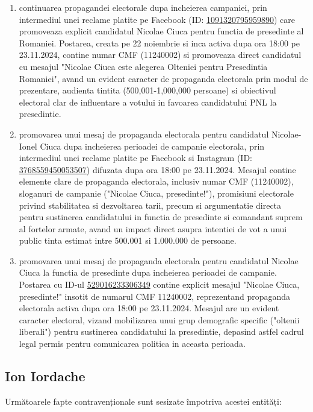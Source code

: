 \documentclass[a4paper,12pt]{article}
\begin{document}
\begin{enumerate}[leftmargin=*, label=\arabic*.)]
    \item continuarea propagandei electorale dupa incheierea campaniei, prin intermediul unei reclame platite pe Facebook (ID: \href{https://www.facebook.com/ads/library/?id=1091320795959890}{1091320795959890}) care promoveaza explicit candidatul Nicolae Ciuca pentru functia de presedinte al Romaniei. Postarea, creata pe 22 noiembrie si inca activa dupa ora 18:00 pe 23.11.2024, contine numar CMF (11240002) si promoveaza direct candidatul cu mesajul "Nicolae Ciuca este alegerea Olteniei pentru Presedintia Romaniei", avand un evident caracter de propaganda electorala prin modul de prezentare, audienta tintita (500,001-1,000,000 persoane) si obiectivul electoral clar de influentare a votului in favoarea candidatului PNL la presedintie.
    \item promovarea unui mesaj de propaganda electorala pentru candidatul Nicolae-Ionel Ciuca dupa incheierea perioadei de campanie electorala, prin intermediul unei reclame platite pe Facebook si Instagram (ID: \href{https://www.facebook.com/ads/library/?id=3768559450053507}{3768559450053507}) difuzata dupa ora 18:00 pe 23.11.2024. Mesajul contine elemente clare de propaganda electorala, inclusiv numar CMF (11240002), sloganuri de campanie ("Nicolae Ciuca, presedinte!"), promisiuni electorale privind stabilitatea si dezvoltarea tarii, precum si argumentatie directa pentru sustinerea candidatului in functia de presedinte si comandant suprem al fortelor armate, avand un impact direct asupra intentiei de vot a unui public tinta estimat intre 500.001 si 1.000.000 de persoane.
    \item promovarea unui mesaj de propaganda electorala pentru candidatul Nicolae Ciuca la functia de presedinte dupa incheierea perioadei de campanie. Postarea cu ID-ul \href{https://www.facebook.com/ads/library/?id=529016233306349}{529016233306349} contine explicit mesajul "Nicolae Ciuca, presedinte!" insotit de numarul CMF 11240002, reprezentand propaganda electorala activa dupa ora 18:00 pe 23.11.2024. Mesajul are un evident caracter electoral, vizand mobilizarea unui grup demografic specific ("oltenii liberali") pentru sustinerea candidatului la presedintie, depasind astfel cadrul legal permis pentru comunicarea politica in aceasta perioada.
\end{enumerate}

\vspace{0.5cm}

\subsection{Ion Iordache}
Următoarele fapte contravenționale sunt sesizate împotriva acestei entități:
\end{document}
